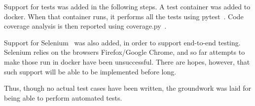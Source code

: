 Support for tests was added in the following steps. A test container was added to docker. When that container runs, it performs all the tests using pytest~\cite{pytest}. Code coverage analysis is then reported using coverage.py~\cite{coverage}. 

Support for Selenium~\cite{selenium} was also added, in order to support end-to-end testing. Selenium relies on the browsers Firefox/Google Chrome, and so far attempts to make those run in docker have been unsuccessful. There are hopes, however, that such support will be able to be implemented before long.

Thus, though no actual test cases have been written, the groundwork was laid for being able to perform automated tests.

\newpage
